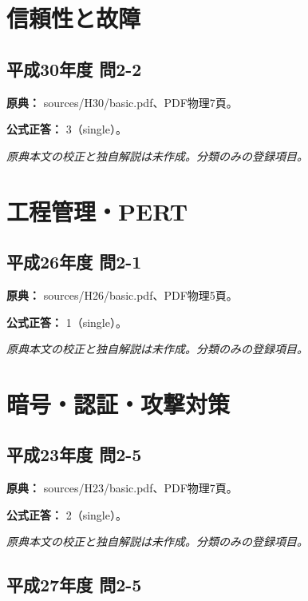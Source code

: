 \section{信頼性と故障}

\subsection{平成30年度 問2-2}
\label{q:h30-reg-basic-2-2}

\noindent\textbf{原典：} sources/H30/basic.pdf、PDF物理7頁。

\textbf{公式正答：} 3（single）。

\par\textit{原典本文の校正と独自解説は未作成。分類のみの登録項目。}

\section{工程管理・PERT}

\subsection{平成26年度 問2-1}
\label{q:h26-reg-basic-2-1}

\noindent\textbf{原典：} sources/H26/basic.pdf、PDF物理5頁。

\textbf{公式正答：} 1（single）。

\par\textit{原典本文の校正と独自解説は未作成。分類のみの登録項目。}

\section{暗号・認証・攻撃対策}

\subsection{平成23年度 問2-5}
\label{q:h23-reg-basic-2-5}

\noindent\textbf{原典：} sources/H23/basic.pdf、PDF物理7頁。

\textbf{公式正答：} 2（single）。

\par\textit{原典本文の校正と独自解説は未作成。分類のみの登録項目。}

\subsection{平成27年度 問2-5}
\label{q:h27-reg-basic-2-5}

